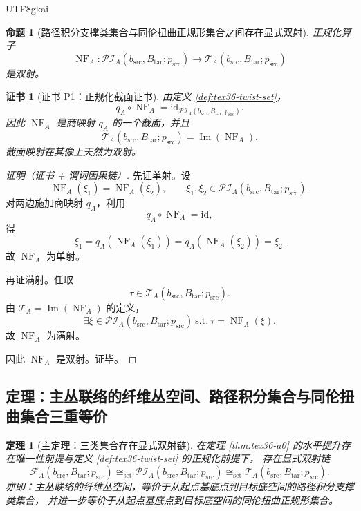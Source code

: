 \documentclass[12pt]{article}
\newtheorem{theorem}{定理}[section]
\newtheorem{proposition}{命题}[section]
\newtheorem{Certificate}{证书}[section]
\newcommand{\Img}{\operatorname{Im}}
\newcommand{\NF}{\operatorname{NF}}
\newcommand{\id}{\mathrm{id}}
\begin{document}
\begin{CJK*}{UTF8}{gkai}
\begin{proposition}[路径积分支撑类集合与同伦扭曲正规形集合之间存在显式双射]
\label{prop:tex36-pi-twist}
正规化算子
\[
  \NF_A:
  \mathcal{PI}_{A}(b_{\mathrm{src}},B_{\mathrm{tar}};p_{\mathrm{src}})
  \to
  \mathcal{T}_{A}(b_{\mathrm{src}},B_{\mathrm{tar}};p_{\mathrm{src}})
\]
是双射。
\end{proposition}

\begin{Certificate}[证书 P1：正规化截面证书]
\label{cert:tex36-p1}
由定义 \ref{def:tex36-twist-set}，
\[
  q_A\circ \NF_A=\id_{\mathcal{PI}_{A}(b_{\mathrm{src}},B_{\mathrm{tar}};p_{\mathrm{src}})}.
\]
因此 $\NF_A$ 是商映射 $q_A$ 的一个截面，并且
\[
  \mathcal{T}_{A}(b_{\mathrm{src}},B_{\mathrm{tar}};p_{\mathrm{src}})
  =\Img(\NF_A).
\]
截面映射在其像上天然为双射。
\end{Certificate}

\begin{proof}[证明（证书 + 谓词因果链）]
先证单射。设
\[
  \NF_A(\xi_1)=\NF_A(\xi_2),
\qquad
  \xi_1,\xi_2\in \mathcal{PI}_{A}(b_{\mathrm{src}},B_{\mathrm{tar}};p_{\mathrm{src}}).
\]
对两边施加商映射 $q_A$，利用
\[
  q_A\circ \NF_A=\id,
\]
得
\[
  \xi_1
  =
  q_A(\NF_A(\xi_1))
  =
  q_A(\NF_A(\xi_2))
  =
  \xi_2.
\]
故 $\NF_A$ 为单射。

再证满射。任取
\[
  \tau\in \mathcal{T}_{A}(b_{\mathrm{src}},B_{\mathrm{tar}};p_{\mathrm{src}}).
\]
由 $\mathcal{T}_A=\Img(\NF_A)$ 的定义，
\[
  \exists \xi\in \mathcal{PI}_{A}(b_{\mathrm{src}},B_{\mathrm{tar}};p_{\mathrm{src}})
  \ \text{s.t.}\
  \tau=\NF_A(\xi).
\]
故 $\NF_A$ 为满射。

因此 $\NF_A$ 是双射。证毕。
\end{proof}

\subsection{定理：主丛联络的纤维丛空间、路径积分集合与同伦扭曲集合三重等价}
\label{subsec:tex36-theorem}

\begin{theorem}[主定理：三类集合存在显式双射链]
\label{thm:tex36-main}
在定理 \ref{thm:tex36-a0} 的水平提升存在唯一性前提与定义 \ref{def:tex36-twist-set} 的正规化前提下，
存在显式双射链
\[
  \mathcal{F}_{A}(b_{\mathrm{src}},B_{\mathrm{tar}};p_{\mathrm{src}})
  \cong_{\mathrm{set}}
  \mathcal{PI}_{A}(b_{\mathrm{src}},B_{\mathrm{tar}};p_{\mathrm{src}})
  \cong_{\mathrm{set}}
  \mathcal{T}_{A}(b_{\mathrm{src}},B_{\mathrm{tar}};p_{\mathrm{src}}).
\]
亦即：主丛联络的纤维丛空间，等价于从起点基底点到目标底空间的路径积分支撑类集合，
并进一步等价于从起点基底点到目标底空间的同伦扭曲正规形集合。
\end{theorem}


\end{CJK*}
\end{document}
